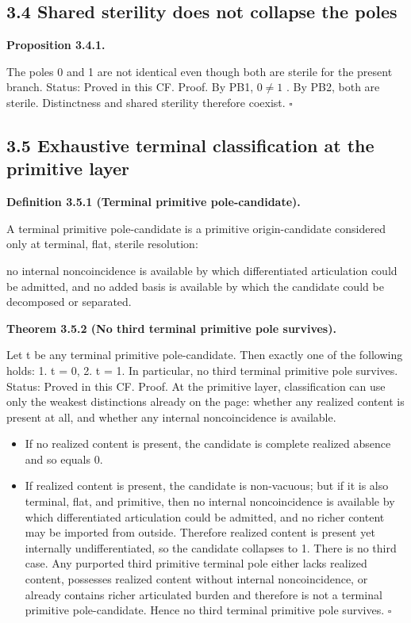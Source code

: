 \documentclass[11pt]{article}
\begin{document}
\subsection{3.4 Shared sterility does not collapse the poles}\label{shared-sterility-does-not-collapse-the-poles}

\textbf{Proposition 3.4.1.}

The poles 0 and 1 are not identical even though both are sterile for the present branch. Status: Proved in this CF. Proof. By PB1,  $0 \neq 1$ . By PB2, both are sterile. Distinctness and shared sterility therefore coexist. $\square$

\subsection{3.5 Exhaustive terminal classification at the primitive layer}\label{exhaustive-terminal-classification-at-the-primitive-layer}

\textbf{Definition 3.5.1 (Terminal primitive pole-candidate).}

A terminal primitive pole-candidate is a primitive origin-candidate considered only at terminal, flat, sterile resolution:

no internal noncoincidence is available by which differentiated articulation could be admitted, and no added basis is available by which the candidate could be decomposed or separated.

\textbf{Theorem 3.5.2 (No third terminal primitive pole survives).}

Let t be any terminal primitive pole-candidate. Then exactly one of the following holds: 1. t = 0, 2. t = 1. In particular, no third terminal primitive pole survives. Status: Proved in this CF. Proof. At the primitive layer, classification can use only the weakest distinctions already on the page: whether any realized content is present at all, and whether any internal noncoincidence is available.

\begin{itemize}
\item
  If no realized content is present, the candidate is complete realized absence and so equals 0.
\item
  If realized content is present, the candidate is non-vacuous; but if it is also terminal, flat, and primitive, then no internal noncoincidence is available by which differentiated articulation could be admitted, and no richer content may be imported from outside. Therefore realized content is present yet internally undifferentiated, so the candidate collapses to 1. There is no third case. Any purported third primitive terminal pole either lacks realized content, possesses realized content without internal noncoincidence, or already contains richer articulated burden and therefore is not a terminal primitive pole-candidate. Hence no third terminal primitive pole survives. $\square$
\end{itemize}
\end{document}
